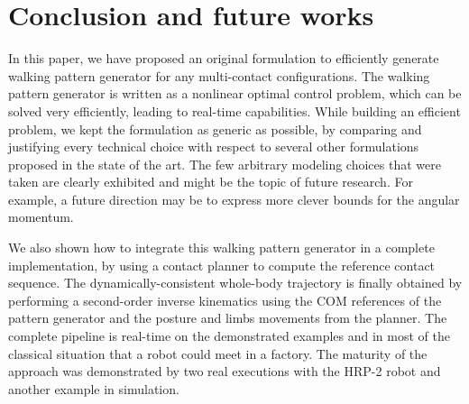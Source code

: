 \section{Conclusion and future works}
\label{sec:conclusion}

In this paper, we have proposed an original formulation to efficiently generate walking pattern generator for any multi-contact configurations. The walking pattern generator is written as a nonlinear optimal control problem, which can be solved very efficiently, leading to real-time capabilities. While building an efficient problem, we kept the formulation as generic as possible, by comparing and justifying every technical choice with respect to several other formulations proposed in the state of the art. The few arbitrary modeling choices that were taken are clearly exhibited and might be the topic of future research. For example, a future direction may be to express more clever bounds for the angular momentum.

We also shown how to integrate this walking pattern generator in a complete implementation, by using a contact planner to compute the reference contact sequence. The dynamically-consistent whole-body trajectory is finally obtained by performing a second-order inverse kinematics using the COM references of the pattern generator and the posture and limbs movements from the planner. The complete pipeline is real-time on the demonstrated examples and in most of the classical situation that a robot could meet in a factory. The maturity of the approach was demonstrated by two real executions with the HRP-2 robot and another example in simulation.
